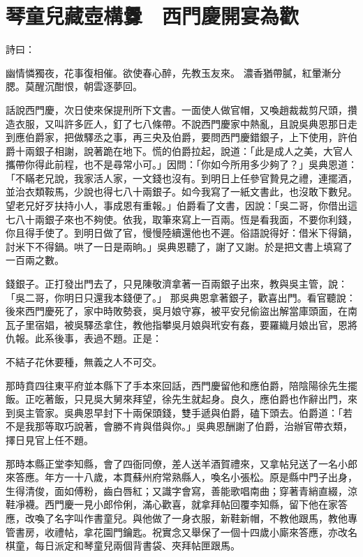 %

\chapter{琴童兒藏壺構釁　西門慶開宴為歡}

詩曰：

幽情憐獨夜，花事復相催。欲使春心醉，先教玉友來。
濃香猶帶膩，紅暈漸分腮。莫醒沉酣恨，朝雲逐夢回。

話說西門慶，次日使來保提刑所下文書。一面使人做官帽，又喚趙裁裁剪尺頭，攢造衣服，又叫許多匠人，釘了七八條帶。不說西門慶家中熱亂，且說吳典恩那日走到應伯爵家，把做驛丞之事，再三央及伯爵，要問西門慶錯銀子，上下使用，許伯爵十兩銀子相謝，說著跪在地下。慌的伯爵拉起，說道：「此是成人之美，大官人攜帶你得此前程，也不是尋常小可。」因問：「你如今所用多少夠了？」吳典恩道：「不瞞老兄說，我家活人家，一文錢也沒有。到明日上任參官贄見之禮，連擺酒，並治衣類鞍馬，少說也得七八十兩銀子。如今我寫了一紙文書此，也沒敢下數兒。望老兄好歹扶持小人，事成恩有重報。」伯爵看了文書，因說：「吳二哥，你借出這七八十兩銀子來也不夠使。依我，取筆來寫上一百兩。恆是看我面，不要你利錢，你且得手使了。到明日做了官，慢慢陸續還他也不遲。俗語說得好：借米下得鍋，討米下不得鍋。哄了一日是兩晌。」吳典恩聽了，謝了又謝。於是把文書上填寫了一百兩之數。

錢銀子。正打發出門去了，只見陳敬濟拿著一百兩銀子出來，教與吳主管，說：「吳二哥，你明日只還我本錢便了。」 那吳典恩拿著銀子，歡喜出門。看官聽說：後來西門慶死了，家中時敗勢衰，吳月娘守寡，被平安兒偷盜出解當庫頭面，在南瓦子里宿娼，被吳驛丞拿住，教他指攀吳月娘與玳安有姦，要羅織月娘出官，恩將仇報。此系後事，表過不題。正是：

不結子花休要種，無義之人不可交。

那時賁四往東平府並本縣下了手本來回話，西門慶留他和應伯爵，陪陰陽徐先生擺飯。正吃著飯，只見吳大舅來拜望，徐先生就起身。良久，應伯爵也作辭出門，來到吳主管家。吳典恩早封下十兩保頭錢，雙手遞與伯爵，磕下頭去。伯爵道：「若不是我那等取巧說著，會勝不肯與借與你。」吳典恩酬謝了伯爵，治辦官帶衣類，擇日見官上任不題。

那時本縣正堂李知縣，會了四衙同僚，差人送羊酒賀禮來，又拿帖兒送了一名小郎來答應。年方一十八歲，本貫蘇州府常熟縣人，喚名小張松。原是縣中門子出身，生得清俊，面如傅粉，齒白唇紅；又識字會寫，善能歌唱南曲；穿著青綃直綴，涼鞋凈襪。西門慶一見小郎伶俐，滿心歡喜，就拿拜帖回覆李知縣，留下他在家答應，改喚了名字叫作書童兒。與他做了一身衣服，新鞋新帽，不教他跟馬，教他專管書房，收禮帖，拿花園門鑰匙。祝實念又舉保了一個十四歲小廝來答應，亦改名棋童，每日派定和琴童兒兩個背書袋、夾拜帖匣跟馬。

